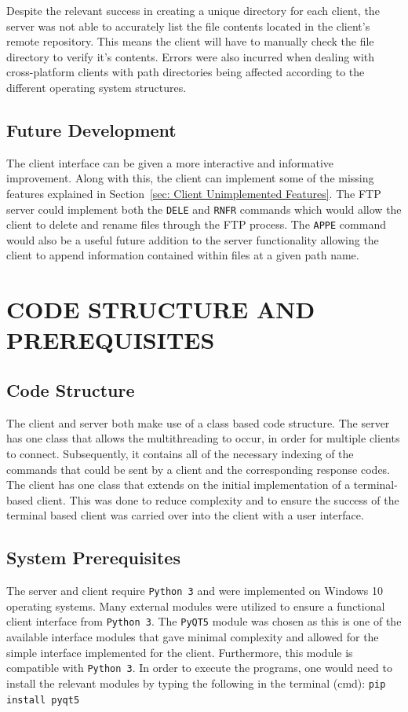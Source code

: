 \documentclass[10pt,twocolumn]{witseiepaper}
\def\code#1{\texttt{#1}}
\begin{document}
Despite the relevant success in creating a unique directory for each client, the server was not able to accurately list the file contents located in the client's remote repository. This means the client will have to manually check the file directory to verify it's contents. Errors were also incurred when dealing with cross-platform clients with path directories being affected according to the different operating system structures. 

\subsection{Future Development}
\label{sec: Future Development}
The client interface can be given a more interactive and informative improvement. Along with this, the client can implement some of the missing features explained in Section~\ref{sec: Client Unimplemented Features}. The FTP server could implement both the \texttt{DELE} and \texttt{RNFR} commands which would allow the client to delete and rename files through the FTP process. The \texttt{APPE} command would also be a useful future addition to the server functionality allowing the client to append information contained within files at a given path name.


%
\section{CODE STRUCTURE AND PREREQUISITES}
\label{sec: CODE STRUCTURE AND PREREQUISITES}

\subsection{Code Structure}
\label{sec: Code Structure}
The client and server both make use of a class based code structure. The server has one class that allows the multithreading to occur, in order for multiple clients to connect. Subsequently, it contains all of the necessary indexing of the commands that could be sent by a client and the corresponding response codes. The client has one class that extends on the initial implementation of a terminal-based client. This was done to reduce complexity and to ensure the success of the terminal based client was carried over into the client with a user interface.

\subsection{System Prerequisites}
\label{sec: System Prerequisites}
The server and client require \code{Python 3} and were implemented on Windows 10 operating systems. Many external modules were utilized to ensure a functional client interface from \code{Python 3}. The \code{PyQT5} module was chosen as this is one of the available interface modules that gave minimal complexity and allowed for the simple interface implemented for the client. Furthermore, this module is compatible with \code{Python 3}. In order to execute the programs, one would need to install the relevant modules by typing the following in the terminal (cmd):
\code{pip install pyqt5}
\end{document}
